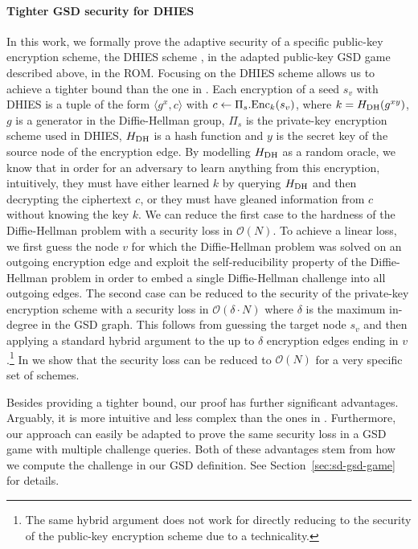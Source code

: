 \paragraph{Tighter GSD security for DHIES} In this work, we formally prove the adaptive security of a specific public-key encryption scheme, the DHIES  scheme \cite{dhies}, in the adapted public-key GSD game described above, in the ROM. Focusing on the DHIES scheme allows us to achieve a tighter bound than the one in \cite{ttkem}. Each encryption of a seed $s_v$ with DHIES is a tuple of the form $\langle g^{x}, c \rangle$ with $c \leftarrow \Pi_s.\mathrm{Enc}_{k}(s_v)$, where $k = H_\mathrm{DH}(g^{x y})$, $g$ is a generator in the Diffie-Hellman group, $\Pi_s$ is the private-key encryption scheme used in DHIES, $H_\mathrm{DH}$ is a hash function and $y$ is the secret key of the source node of the encryption edge. By modelling $H_\mathrm{DH}$ as a random oracle, we know that in order for an adversary to learn anything from this encryption, intuitively, they must have either learned $k$ by querying $H_\mathrm{DH}$ and then decrypting the ciphertext $c$, or they must have gleaned information from $c$ without knowing the key $k$. We can reduce the first case to the hardness of the Diffie-Hellman problem with a security loss in $\mathcal{O}(N)$. To achieve a linear loss, we first guess the node $v$ for which the Diffie-Hellman problem was solved on an outgoing encryption edge and exploit the self-reducibility property of the Diffie-Hellman problem in order to embed a single Diffie-Hellman challenge into all outgoing edges. The second case can be reduced to the security of the private-key encryption scheme with a security loss in $\mathcal{O}(\delta \cdot N)$ where $\delta$ is the maximum in-degree in the GSD graph.
This follows from guessing the target node $s_v$ and then applying a standard hybrid argument to the up to $\delta$ encryption edges ending in $v$.\footnote{The same hybrid argument does not work for directly reducing to the security of the public-key encryption scheme due to a technicality.} In \cite[Section~\ref*{sec:tighter-mis-eav-security}]{full-version} we show that the security loss can be reduced to $\mathcal{O}(N)$ for a very specific set of schemes.

Besides providing a tighter bound, our proof has further significant advantages. Arguably, it is more intuitive and less complex than the ones in \cite{modular-group-messaging,ttkem}. Furthermore, our approach can easily be adapted to prove the same security loss in a GSD game with multiple challenge queries. Both of these advantages stem from how we compute the challenge in our GSD definition. See Section~\ref{sec:sd-gsd-game} for details.

